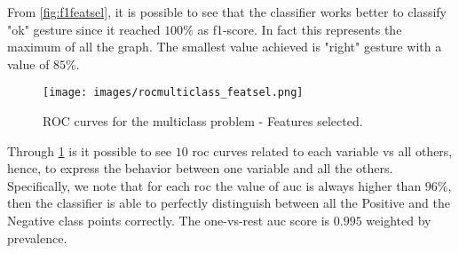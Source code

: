 \noindent From \ref{fig:f1featsel}, it is possible to see that the classifier works better to classify "ok" gesture since it reached $100\%$ as f1-score. In fact this represents the maximum of all the graph. The smallest value achieved is "right" gesture with a value of $85\%$. \\

\begin{figure}[H]
	\centering
	\texttt{[image: images/rocmulticlass\_featsel.png]}
	\caption[ROC curves for the multiclass problem - Features selected.]{ROC curves for the multiclass problem - Features selected.}
	\label{fig:roccurvesfeatsel}
\end{figure}

\noindent Through \ref{fig:roccurvesfeatsel} is it possible to see $10$ \gls{roc} curves related to each variable vs all others, hence, to express the behavior between one variable and all the others. Specifically, we note that for each \gls{roc} the value of \gls{auc} is always higher than $96\%$, then the classifier is able to perfectly distinguish between all the Positive and the Negative class points correctly. The one-vs-rest \gls{auc} score is $0.995$ weighted by prevalence. \\

